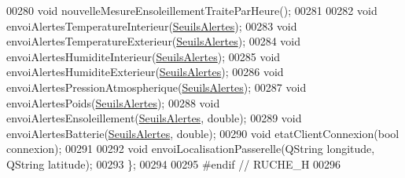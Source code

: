 \begin{DoxyCode}
00280         \textcolor{keywordtype}{void} nouvelleMesureEnsoleillementTraiteParHeure();
00281 
00282         \textcolor{keywordtype}{void} envoiAlertesTemperatureInterieur(\hyperlink{parametres_8h_aaa6de8207c94675264c90b10b613368d}{SeuilsAlertes});
00283         \textcolor{keywordtype}{void} envoiAlertesTemperatureExterieur(\hyperlink{parametres_8h_aaa6de8207c94675264c90b10b613368d}{SeuilsAlertes});
00284         \textcolor{keywordtype}{void} envoiAlertesHumiditeInterieur(\hyperlink{parametres_8h_aaa6de8207c94675264c90b10b613368d}{SeuilsAlertes});
00285         \textcolor{keywordtype}{void} envoiAlertesHumiditeExterieur(\hyperlink{parametres_8h_aaa6de8207c94675264c90b10b613368d}{SeuilsAlertes});
00286         \textcolor{keywordtype}{void} envoiAlertesPressionAtmospherique(\hyperlink{parametres_8h_aaa6de8207c94675264c90b10b613368d}{SeuilsAlertes});
00287         \textcolor{keywordtype}{void} envoiAlertesPoids(\hyperlink{parametres_8h_aaa6de8207c94675264c90b10b613368d}{SeuilsAlertes});
00288         \textcolor{keywordtype}{void} envoiAlertesEnsoleillement(\hyperlink{parametres_8h_aaa6de8207c94675264c90b10b613368d}{SeuilsAlertes}, \textcolor{keywordtype}{double});
00289         \textcolor{keywordtype}{void} envoiAlertesBatterie(\hyperlink{parametres_8h_aaa6de8207c94675264c90b10b613368d}{SeuilsAlertes}, \textcolor{keywordtype}{double});
00290         \textcolor{keywordtype}{void} etatClientConnexion(\textcolor{keywordtype}{bool} connexion);
00291 
00292         \textcolor{keywordtype}{void} envoiLocalisationPasserelle(QString longitude, QString latitude);
00293 \};
00294 
00295 \textcolor{preprocessor}{#endif // RUCHE\_H}
00296 
\end{DoxyCode}
